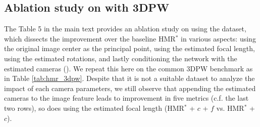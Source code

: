 \documentclass[10pt,twocolumn,letterpaper,usenames,dvipsnames]{article}
\begin{document}
\begin{table}[]
    \centering
    \caption{{\bf HPS optimization with an estimated camera.}  \smplify on the 3DPW validation set.}
    \label{tab:smplify_3dpw}
\end{table} 
\subsection{Ablation study on \methodname with 3DPW}
The Table 5 in the main text provides an ablation study on \methodname using the \agoracam dataset, 
which dissects the improvement over the baseline HMR$^*$ in various aspects: using the original image center as the principal point, using the \camcalib estimated focal length, using the estimated rotations, and lastly conditioning the network with the estimated cameras (\methodname).
We repeat this here on the common 3DPW benchmark as in Table \ref{tab:hmr_3dpw}.
Despite that it is not a suitable dataset to analyze the impact of each camera parameters, we still observe that appending the estimated cameras to the image feature leads to improvement in five metrics (c.f. the last two rows), 
so does using the estimated focal length (HMR$^{*}$ + $c$ + $f$ vs.  HMR$^{*}$ + $c$).
\end{document}

